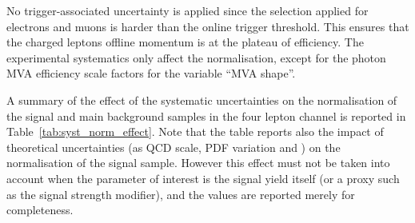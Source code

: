 No trigger-associated uncertainty is applied since the \pt selection applied for electrons and muons
is harder than the online trigger threshold.
This ensures that the charged leptons offline momentum is at the plateau of efficiency.
The experimental systematics only affect the normalisation,
except for the photon MVA efficiency scale factors for the variable ``MVA shape''.

A summary of the effect of the systematic uncertainties on the normalisation
of the signal and main background samples in the four lepton channel is reported in Table~\ref{tab:syst_norm_effect}.
Note that the table reports also the impact of theoretical uncertainties
(\ie as QCD scale, PDF variation and \alpS) on the normalisation of the signal sample.
However this effect must not be taken into account when the parameter of interest is the
signal yield itself (or a proxy such as the signal strength modifier),
and the values are reported merely for completeness.

